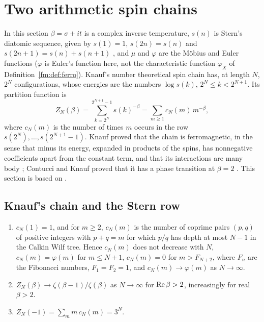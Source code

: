 \ifdefined\conjecture\else\theoremstyle{sc}\newtheorem{conjecture}[theorem]{Conjecture}\theoremstyle{scr}\fi
\section{Two arithmetic spin chains}\label{ch:fmchain}

In this section $\beta=\sigma+it$ is a complex inverse temperature, $s(n)$ is Stern's diatomic sequence, given by $s(1)=1$, $s(2n)=s(n)$ and $s(2n+1)=s(n)+s(n+1)$ \cite{Stern1858}, and $\mu$ and $\varphi$ are the M\"obius and Euler functions ($\varphi$ is Euler's function here, not the characteristic function $\varphi_X$ of Definition~\ref{fm:def:ferro}). Knauf's number theoretical spin chain \cite{Knauf93,Knauf98} has, at length $N$, $2^N$ configurations, whose energies are the numbers $\log s(k)$, $2^N\le k<2^{N+1}$. Its partition function is
\begin{equation}\label{fm:eq:knauf}
Z_N(\beta)=\sum_{k=2^N}^{2^{N+1}-1}s(k)^{-\beta}=\sum_{m\ge1}c_N(m)\,m^{-\beta},
\end{equation}
where $c_N(m)$ is the number of times $m$ occurs in the row $s(2^N),\dots,s(2^{N+1}-1)$. Knauf proved that the chain is ferromagnetic, in the sense that minus its energy, expanded in products of the spins, has nonnegative coefficients apart from the constant term, and that its interactions are many body \cite{Knauf93}; Contucci and Knauf proved that it has a phase transition at $\beta=2$ \cite{ContucciKnauf97}. This section is based on \cite{P26fchap}.

\subsection{Knauf's chain and the Stern row}\label{fm:sec:stern}

\begin{proposition}\label{fm:prop:stern}
\begin{enumerate}
\item[(i)] $c_N(1)=1$, and for $m\ge2$, $c_N(m)$ is the number of coprime pairs $(p,q)$ of positive integers with $p+q=m$ for which $p/q$ has depth at most $N-1$ in the Calkin Wilf tree. Hence $c_N(m)$ does not decrease with $N$, $c_N(m)=\varphi(m)$ for $m\le N+1$, $c_N(m)=0$ for $m>F_{N+2}$, where $F_n$ are the Fibonacci numbers, $F_1=F_2=1$, and $c_N(m)\to\varphi(m)$ as $N\to\infty$.
\item[(ii)] $Z_N(\beta)\to\zeta(\beta-1)/\zeta(\beta)$ as $N\to\infty$ for $\operatorname{Re}\beta>2$, increasingly for real $\beta>2$.
\item[(iii)] $Z_N(-1)=\sum_mm\,c_N(m)=3^N$.
\end{enumerate}
\end{proposition}

